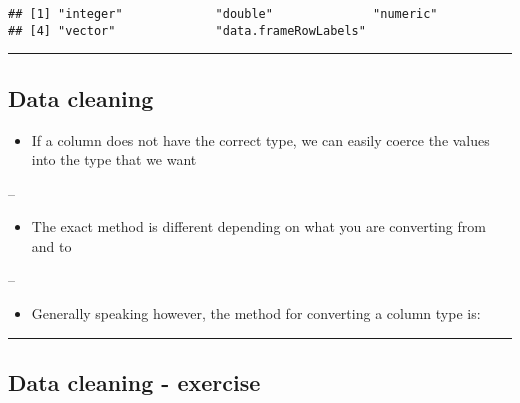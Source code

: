 \documentclass[]{article}
\newenvironment{Shaded}{\begin{snugshade}}{\end{snugshade}}
\newcommand{\KeywordTok}[1]{\textcolor[rgb]{0.13,0.29,0.53}{\textbf{#1}}}
\newcommand{\NormalTok}[1]{#1}
\newcommand{\OperatorTok}[1]{\textcolor[rgb]{0.81,0.36,0.00}{\textbf{#1}}}
\newcommand{\StringTok}[1]{\textcolor[rgb]{0.31,0.60,0.02}{#1}}
\providecommand{\tightlist}{%
  \setlength{\itemsep}{0pt}\setlength{\parskip}{0pt}}
\begin{document}
\begin{verbatim}
## [1] "integer"             "double"              "numeric"            
## [4] "vector"              "data.frameRowLabels"
\end{verbatim}

\begin{center}\rule{0.5\linewidth}{\linethickness}\end{center}

\hypertarget{data-cleaning-3}{%
\subsection{Data cleaning}\label{data-cleaning-3}}

\begin{itemize}
\tightlist
\item
  If a column does not have the correct type, we can easily coerce the
  values into the type that we want
\end{itemize}

--

\begin{itemize}
\tightlist
\item
  The exact method is different depending on what you are converting
  from and to
\end{itemize}

--

\begin{itemize}
\tightlist
\item
  Generally speaking however, the method for converting a column type
  is:
\end{itemize}

\begin{Shaded}
\end{Shaded}

\begin{center}\rule{0.5\linewidth}{\linethickness}\end{center}

\hypertarget{data-cleaning---exercise}{%
\subsection{Data cleaning - exercise}\label{data-cleaning---exercise}}
\end{document}
